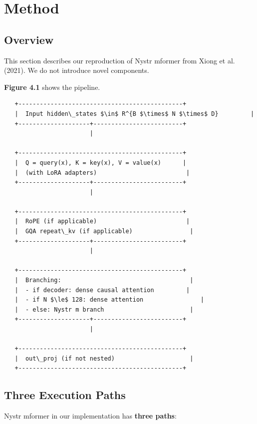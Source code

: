 
\section{Method}

\subsection{Overview}

This section describes our reproduction of Nystr mformer from Xiong et al. 
(2021). We do not introduce novel components.

\textbf{Figure 4.1} shows the pipeline.

\begin{lstlisting}
   +----------------------------------------------+
   |  Input hidden\_states $\in$ R^{B $\times$ N $\times$ D}         |
   +--------------------+-------------------------+
                        |
                         
   +----------------------------------------------+
   |  Q = query(x), K = key(x), V = value(x)      |
   |  (with LoRA adapters)                         |
   +--------------------+-------------------------+
                        |
                         
   +----------------------------------------------+
   |  RoPE (if applicable)                         |
   |  GQA repeat\_kv (if applicable)                |
   +--------------------+-------------------------+
                        |
                         
   +----------------------------------------------+
   |  Branching:                                    |
   |  - if decoder: dense causal attention         |
   |  - if N $\le$ 128: dense attention                |
   |  - else: Nystr m branch                        |
   +--------------------+-------------------------+
                        |
                         
   +----------------------------------------------+
   |  out\_proj (if not nested)                     |
   +----------------------------------------------+
\end{lstlisting}

\subsection{Three Execution Paths}

Nystr mformer in our implementation has \textbf{three paths}:

